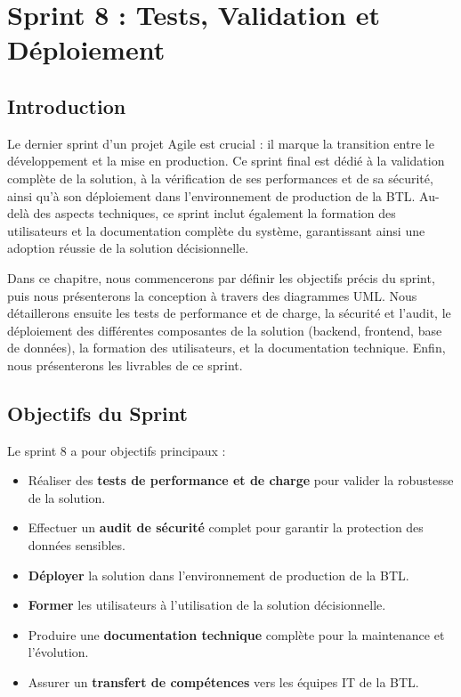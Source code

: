 \chapter{Sprint 8 : Tests, Validation et Déploiement}
\label{chap:sprint8-deploiement}

\section*{Introduction}

Le dernier sprint d'un projet Agile est crucial : il marque la transition entre le développement et la mise en production. Ce sprint final est dédié à la validation complète de la solution, à la vérification de ses performances et de sa sécurité, ainsi qu'à son déploiement dans l'environnement de production de la BTL. Au-delà des aspects techniques, ce sprint inclut également la formation des utilisateurs et la documentation complète du système, garantissant ainsi une adoption réussie de la solution décisionnelle.

Dans ce chapitre, nous commencerons par définir les objectifs précis du sprint, puis nous présenterons la conception à travers des diagrammes UML. Nous détaillerons ensuite les tests de performance et de charge, la sécurité et l'audit, le déploiement des différentes composantes de la solution (backend, frontend, base de données), la formation des utilisateurs, et la documentation technique. Enfin, nous présenterons les livrables de ce sprint.

\section{Objectifs du Sprint}
\label{sec:sprint8-objectifs}

Le sprint 8 a pour objectifs principaux :

\begin{itemize}
    \item Réaliser des \textbf{tests de performance et de charge} pour valider la robustesse de la solution.
    \item Effectuer un \textbf{audit de sécurité} complet pour garantir la protection des données sensibles.
    \item \textbf{Déployer} la solution dans l'environnement de production de la BTL.
    \item \textbf{Former} les utilisateurs à l'utilisation de la solution décisionnelle.
    \item Produire une \textbf{documentation technique} complète pour la maintenance et l'évolution.
    \item Assurer un \textbf{transfert de compétences} vers les équipes IT de la BTL.
\end{itemize}

